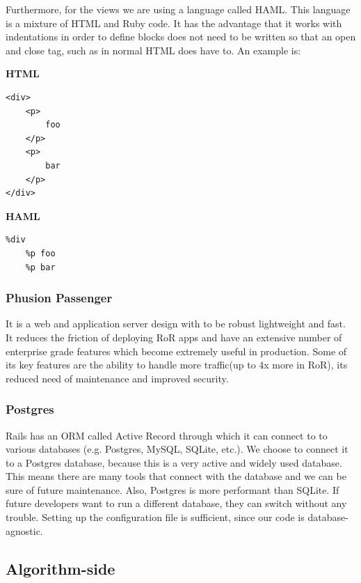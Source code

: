 Furthermore, for the views we are using a language called HAML. This language is a mixture of HTML and Ruby code. It has the advantage that it works with indentations in order to define blocks does not need to be written so that an open and close tag, such as in normal HTML does have to. An example is:

\textbf{HTML}
\begin{verbatim}
<div>
	<p>
		foo
	</p>
	<p>
		bar
	</p>
</div>
\end{verbatim}

\textbf{HAML}
\begin{verbatim}
%div
	%p foo
	%p bar
\end{verbatim}

\subsubsection{Phusion Passenger}
It is a web and application server design with to be robust lightweight and fast. It reduces the friction of deploying RoR apps and have an extensive number of enterprise grade features which become extremely useful in production. Some of its key features are the ability to handle more traffic(up to 4x more in RoR), its reduced need of maintenance and improved security. 

\subsubsection{Postgres}
Rails has an ORM called Active Record through which it can connect to to various databases (e.g. Postgres, MySQL, SQLite, etc.). We choose to connect it to a Postgres database, because this is a very active and widely used database. This means there are many tools that connect with the database and we can be sure of future maintenance. Also, Postgres is more performant than SQLite.
If future developers want to run a different database, they can switch without any trouble. Setting up the configuration file is sufficient, since our code is database-agnostic.

\subsection{Algorithm-side}

